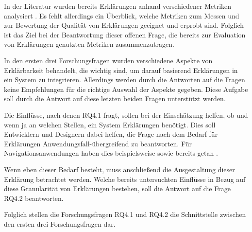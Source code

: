 In der Literatur wurden bereits Erklärungen anhand verschiedener Metriken analysiert \cite{wiegand2019drive,briand1995goal}. Es fehlt allerdings ein Überblick, welche Metriken zum Messen und zur Bewertung der Qualität von Erklärungen geeignet und erprobt sind. Folglich ist das Ziel bei der Beantwortung dieser offenen Frage, die bereits zur Evaluation von Erklärungen genutzten Metriken zusammenzutragen.

\smallskip

\noindent{}

\smallskip

In den ersten drei Forschungsfragen wurden verschiedene Aspekte von Erklärbarkeit behandelt, die wichtig sind, um darauf basierend Erklärungen in ein System zu integrieren. Allerdings werden durch die Antworten auf die Fragen keine Empfehlungen für die richtige Auswahl der Aspekte gegeben. Diese Aufgabe soll durch die Antwort auf diese letzten beiden Fragen unterstützt werden.

Die Einflüsse, nach denen RQ4.1 fragt, sollen bei der Einschätzung helfen, ob und wenn ja an welchen Stellen, ein System Erklärungen benötigt. Dies soll Entwicklern und Designern dabei helfen, die Frage nach dem Bedarf für Erklärungen Anwendungsfall-übergreifend zu beantworten. Für Navigationsanwendungen haben dies beispielsweise \citeauthor{chazette_end-users_nodate} sowie \citeauthor{wang_integration_2020} bereits getan \cite{chazette_end-users_nodate,wang_integration_2020}.

Wenn eben dieser Bedarf besteht, muss anschließend die Ausgestaltung dieser Erklärung betrachtet werden. Welche bereits untersuchten Einflüsse in Bezug auf diese Granularität von Erklärungen bestehen, soll die Antwort auf die Frage RQ4.2 beantworten.

Folglich stellen die Forschungsfragen RQ4.1 und RQ4.2 die Schnittstelle zwischen den ersten drei Forschungsfragen dar.



